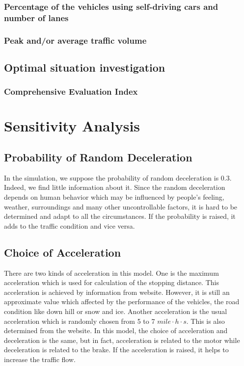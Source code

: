 \documentclass[a4paper]{article}
\begin{document}
	\subsubsection{Percentage of the vehicles using self-driving cars and number of lanes}%
	\subsubsection{Peak and/or average traffic volume }%
	
	\subsection{Optimal situation investigation}
	\subsubsection{Comprehensive Evaluation Index}
	
	
	\section{Sensitivity Analysis}
	\subsection{Probability of Random Deceleration}
	In the simulation, we suppose the probability of random deceleration is 0.3. Indeed, we find little information about it. Since the random deceleration depends on human behavior which may be influenced by people's feeling, weather, surroundings and many other uncontrollable factors, it is hard to be determined and adapt to all the circumstances. If the probability is raised, it adds to the traffic condition and vice versa. 
	\subsection{Choice of Acceleration}
	There are two kinds of acceleration in this model. One is the maximum acceleration which is used for calculation of the stopping distance. This acceleration is achieved by information from website\cite{stopping}. However, it is still an approximate value which affected by the performance of the vehicles, the road condition like down hill or snow and ice. Another acceleration is the usual acceleration which is randomly chosen from 5 to 7 $ mile\cdot h\cdot s $. This is also determined from the website\cite{acc}. In this model, the choice of acceleration and deceleration is the same, but in fact, acceleration is related to the motor while deceleration is related to the brake. If the acceleration is raised, it helps to increase the traffic flow.
\end{document}
